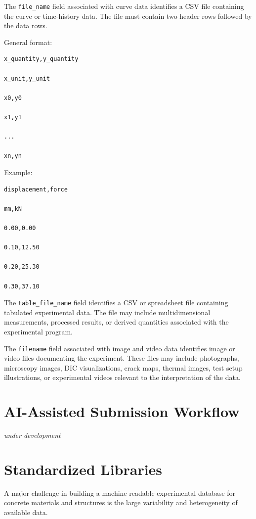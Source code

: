 \documentclass[11pt]{book}
\begin{document}
The \texttt{file\_name} field associated with curve data identifies a CSV file containing
the curve or time-history data. The file must contain two header rows followed by the
data rows.

General format:

\begin{verbatim}
x_quantity,y_quantity

x_unit,y_unit

x0,y0

x1,y1

...

xn,yn
\end{verbatim}

Example:

\begin{verbatim}
displacement,force

mm,kN

0.00,0.00

0.10,12.50

0.20,25.30

0.30,37.10
\end{verbatim}

The \texttt{table\_file\_name} field identifies a CSV or spreadsheet file containing
tabulated experimental data. The file may include multidimensional measurements,
processed results, or derived quantities associated with the experimental program.

The \texttt{filename} field associated with image and video data identifies image or
video files documenting the experiment. These files may include photographs,
microscopy images, DIC visualizations, crack maps, thermal images, test setup
illustrations, or experimental videos relevant to the interpretation of the data.


\newpage
\chapter{AI-Assisted Submission Workflow}
{\emph{under development}}

\newpage
\chapter{Standardized Libraries}

A major challenge in building a machine-readable experimental database for concrete materials and structures is the large variability and heterogeneity of  available data.
\end{document}
